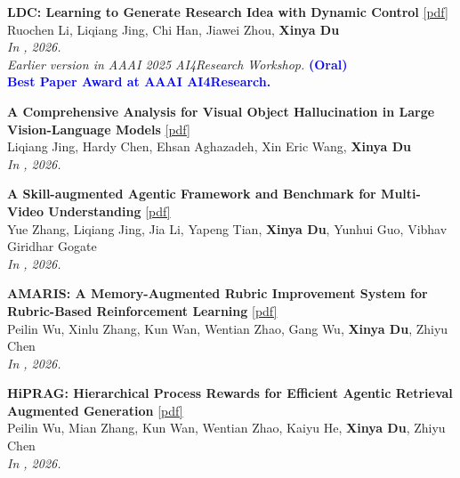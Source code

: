 \begin{enumerate}[{[}1{]},leftmargin=*]

\parbox{\textwidth}{
\item
{\bf LDC: Learning to Generate Research Idea with Dynamic Control}
\href{https://arxiv.org/abs/2412.14626}{{{[pdf]}}} \\
Ruochen Li, Liqiang Jing, Chi Han, Jiawei Zhou, \textbf{Xinya Du} \\
{\it In \EMNLP, 2026.} \\
{\it Earlier version in AAAI 2025 AI4Research Workshop.} {\textcolor{blue}{\textbf{(Oral)}}} \\
{\textcolor{blue}{\textbf{Best Paper Award at AAAI AI4Research.}}} \\
}

\parbox{\textwidth}{
\item
{\bf A Comprehensive Analysis for Visual Object Hallucination in Large Vision-Language Models}
\href{https://arxiv.org/abs/2505.01958}{{{[pdf]}}} \\
Liqiang Jing, Hardy Chen, Ehsan Aghazadeh, Xin Eric Wang, \textbf{Xinya Du} \\
{\it In \EMNLPfinding, 2026.} \\
}

\parbox{\textwidth}{
\item
{\bf A Skill-augmented Agentic Framework and Benchmark for Multi-Video Understanding}
\href{https://arxiv.org/abs/2603.14733}{{{[pdf]}}} \\
Yue Zhang, Liqiang Jing, Jia Li, Yapeng Tian, \textbf{Xinya Du}, Yunhui Guo, Vibhav Giridhar Gogate \\
{\it In \EMNLPfinding, 2026.} \\
}

\parbox{\textwidth}{
\item
{\bf AMARIS: A Memory-Augmented Rubric Improvement System for Rubric-Based Reinforcement Learning}
\href{https://arxiv.org/abs/2605.18592}{{{[pdf]}}} \\
Peilin Wu, Xinlu Zhang, Kun Wan, Wentian Zhao, Gang Wu, \textbf{Xinya Du}, Zhiyu Chen \\
{\it In \EMNLPfinding, 2026.} \\
}


\parbox{\textwidth}{
\item
{\bf HiPRAG: Hierarchical Process Rewards for Efficient Agentic Retrieval Augmented Generation}
\href{https://arxiv.org/pdf/2510.07794}{{{[pdf]}}} \\
Peilin Wu, Mian Zhang, Kun Wan, Wentian Zhao, Kaiyu He, \textbf{Xinya Du}, Zhiyu Chen \\
{\it In \ICLR, 2026.} \\
}


\end{enumerate}
